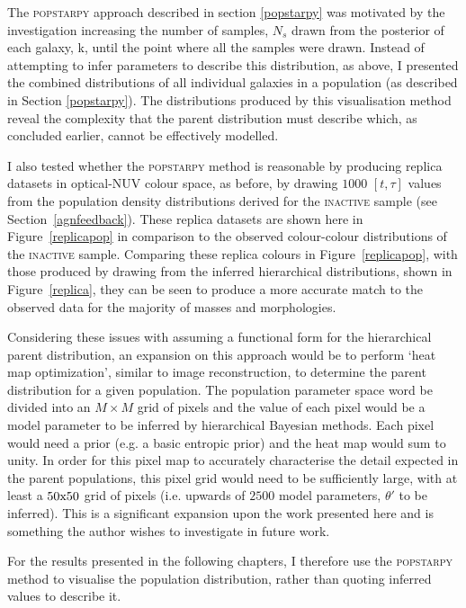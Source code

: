The \textsc{popstarpy} approach described in section \ref{popstarpy} was motivated by the investigation increasing the number of samples, $N_s$ drawn from the posterior of each galaxy, k, until the point where all the samples were drawn. Instead of attempting to infer parameters to describe this distribution, as above, I presented the combined distributions of all individual galaxies in a population (as described in Section \ref{popstarpy}).  The distributions produced by this visualisation method reveal the complexity that the parent distribution must describe which, as concluded earlier, cannot be effectively modelled.

I also tested whether the \textsc{popstarpy} method is reasonable by producing replica datasets in optical-NUV colour space, as before, by drawing $1000$ $[t, \tau]$ values from the population density distributions derived for the \textsc{inactive} sample (see Section~\ref{agnfeedback}). These replica datasets are shown here in Figure~\ref{replicapop} in comparison to the observed colour-colour distributions of the \textsc{inactive} sample. Comparing these replica colours in Figure~\ref{replicapop}, with those produced by drawing from the inferred hierarchical distributions, shown in Figure~\ref{replica}, they can be seen to produce a more accurate match to the observed data for the majority of masses and morphologies. 

Considering these issues with assuming a functional form for the hierarchical parent distribution, an expansion on this approach would be to perform `heat map optimization', similar to image reconstruction, to determine the parent distribution for a given population. The population parameter space word be divided into an $M \times M$ grid of pixels and the value of each pixel would be a model parameter to be inferred by hierarchical Bayesian methods. Each pixel would need a prior (e.g. a basic entropic prior) and the heat map would sum to unity. In order for this pixel map to accurately characterise the detail expected in the parent populations, this pixel grid would need to be sufficiently large, with at least a $50\rm{x}50$ grid of pixels (i.e. upwards of $2500$ model parameters, $\theta'$ to be inferred). This is a significant expansion upon the work presented here and is something the author wishes to investigate in future work.

For the results presented in the following chapters, I therefore use the \textsc{popstarpy} method to visualise the population distribution, rather than quoting inferred values to describe it.


